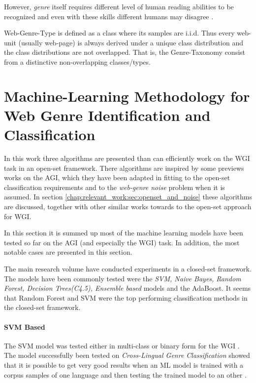 However, \textit{genre} itself requires different level of human reading abilities to be recognized and even with these skills different humans may disagree \parencite{mccarthy2009psychological}.

\begin{definition} Web-Genre-Type is defined as a class where its samples are i.i.d. Thus every web-unit (usually web-page) is always derived under a unique class distribution and the class distributions are not overlapped. That is, the Genre-Taxonomy consist from a distinctive non-overlapping classes/types.
\end{definition}

\section{Machine-Learning Methodology for Web Genre Identification and Classification}\label{chap:relevant_work:sec:machine_learning_methods}

In this work three algorithms are presented than can efficiently work on the WGI task in an open-set framework. There algorithms are inspired by some previews works on the AGI, which they have been adapted in fitting to the open-set classification requirements and to the \textit{web-genre noise} problem when it is assumed. In section \ref{chap:relevant_work:sec:openset_and_noise} these algorithms are discussed, together with other similar works towards to the open-set approach for WGI.

In this section it is summed up most of the machine learning models have been tested so far on the AGI (and especially the WGI) task. In addition, the most notable cases are presented in this section.

The main research volume have conducted experiments in a closed-set framework. The models have been commonly tested were the \textit{SVM, Naive Bayes, Random Forest, Decision Trees(C4.5), Ensemble based} models and the AdaBoost\parencite{lee2017text}. It seems that Random Forest and SVM were the top performing classification methods in the closed-set framework.

\paragraph{SVM Based} The SVM model was tested either in multi-class or binary form for the WGI \parencite{dai2018fine}. The model successfully been tested on \textit{Cross-Lingual Genre Classification} showed that it is possible to get very good results when an ML model is trained with a corpus samples of one language and then testing the trained model to an other \parencite{nguyen2019cross}. 

